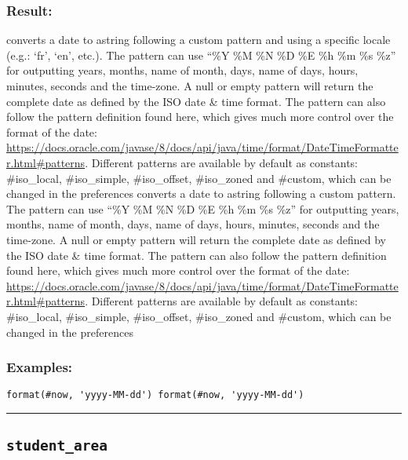 \documentclass[]{book}
\theoremstyle{definition}
\theoremstyle{definition}
\theoremstyle{definition}
\theoremstyle{remark}
\begin{document}
\subsubsection{Result:}\label{result-488}

converts a date to astring following a custom pattern and using a
specific locale (e.g.: `fr', `en', etc.). The pattern can use ``\%Y \%M
\%N \%D \%E \%h \%m \%s \%z'' for outputting years, months, name of
month, days, name of days, hours, minutes, seconds and the time-zone. A
null or empty pattern will return the complete date as defined by the
ISO date \& time format. The pattern can also follow the pattern
definition found here, which gives much more control over the format of
the date:
\url{https://docs.oracle.com/javase/8/docs/api/java/time/format/DateTimeFormatter.html\#patterns}.
Different patterns are available by default as constants: \#iso\_local,
\#iso\_simple, \#iso\_offset, \#iso\_zoned and \#custom, which can be
changed in the preferences converts a date to astring following a custom
pattern. The pattern can use ``\%Y \%M \%N \%D \%E \%h \%m \%s \%z'' for
outputting years, months, name of month, days, name of days, hours,
minutes, seconds and the time-zone. A null or empty pattern will return
the complete date as defined by the ISO date \& time format. The pattern
can also follow the pattern definition found here, which gives much more
control over the format of the date:
\url{https://docs.oracle.com/javase/8/docs/api/java/time/format/DateTimeFormatter.html\#patterns}.
Different patterns are available by default as constants: \#iso\_local,
\#iso\_simple, \#iso\_offset, \#iso\_zoned and \#custom, which can be
changed in the preferences

\subsubsection{Examples:}\label{examples-351}

\begin{verbatim}
format(#now, 'yyyy-MM-dd') format(#now, 'yyyy-MM-dd') 
\end{verbatim}

\begin{center}\rule{0.5\linewidth}{\linethickness}\end{center}

\subsection{\texorpdfstring{\texttt{student\_area}}{student\_area}}\label{student_area}
\end{document}
